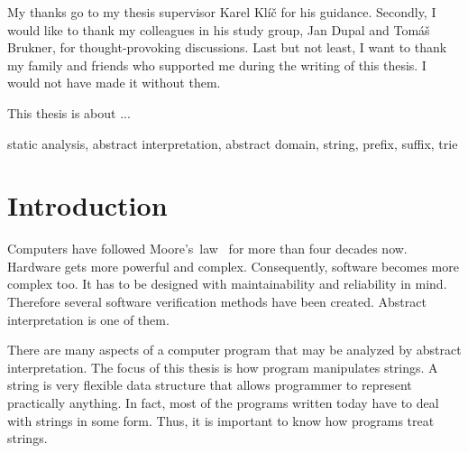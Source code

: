 \documentclass[12pt,final,oneside]{fithesis2}
\theoremstyle{definition}
\newcommand\emptypage{\newpage\null\thispagestyle{empty}\newpage}
\begin{document}
\FrontMatter
\ThesisTitlePage

\emptypage

\begin{ThesisDeclaration}
  \DeclarationText
  \AdvisorName
\end{ThesisDeclaration}

\begin{ThesisThanks}
My thanks go to my thesis supervisor Karel Klíč for his guidance. Secondly,
I would like to thank my colleagues in his study group, Jan Dupal and
Tomáš Brukner, for thought-provoking discussions. Last but not least, I want
to thank my family and friends who supported me during the writing of this
thesis. I would not have made it without them.
\end{ThesisThanks}

\begin{ThesisAbstract}
This thesis is about ...
\end{ThesisAbstract}

\begin{ThesisKeyWords}
static analysis, abstract interpretation, abstract domain, string,
prefix, suffix, trie
\end{ThesisKeyWords}

\MainMatter

\tableofcontents


\chapter{Introduction}

Computers have followed Moore's~law~\cite{Moore65-1} for more than
four decades now. Hardware gets more powerful and complex. Consequently,
software becomes more complex too. It has to be designed
with maintainability and reliability in mind. Therefore several software
verification methods have been created. Abstract interpretation is one
of them.

There are many aspects of a computer program that may be analyzed by
abstract interpretation. The focus of this thesis is how program manipulates
strings. A string is very flexible data structure that allows programmer
to represent practically anything. In fact, most of the programs written
today have to deal with strings in some form. Thus, it is important to know
how programs treat strings.
\end{document}

